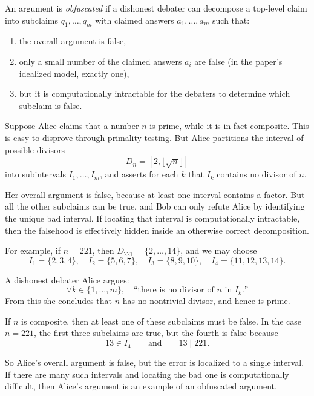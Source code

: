 \documentclass[11pt]{article}
\begin{document}
\begin{definition}
An argument is \emph{obfuscated} if a dishonest debater can decompose a top-level claim
into subclaims \(q_1,\dots,q_m\) with claimed answers \(a_1,\dots,a_m\) such that:
\begin{enumerate}
    \item the overall argument is false,
    \item only a small number of the claimed answers \(a_i\) are false (in the paper's idealized model, exactly one),
    \item but it is computationally intractable for the debaters to determine which subclaim is false.
\end{enumerate}
\end{definition}

\begin{example}
Suppose Alice claims that a number \(n\) is prime, while it is in fact composite. This is easy to disprove through primality testing. But Alice partitions the interval of possible divisors
\[
D_n = [2,\lfloor \sqrt{n}\rfloor]
\]
into subintervals \(I_1,\dots,I_m\), and asserts for each \(k\) that \(I_k\) contains no divisor of \(n\).

Her overall argument is false, because at least one interval contains a factor. But all the other subclaims can be true, and Bob can only refute Alice by identifying the unique bad interval. If locating that interval is computationally intractable, then the falsehood is effectively hidden inside an otherwise correct decomposition.

For example, if \(n=221\), then \(D_{221}=\{2,\dots,14\}\), and we may choose
\[
I_1=\{2,3,4\},\quad
I_2=\{5,6,7\},\quad
I_3=\{8,9,10\},\quad
I_4=\{11,12,13,14\}.
\]

A dishonest debater Alice argues:
\[
\forall k\in\{1,\dots,m\},\quad
\text{``there is no divisor of \(n\) in \(I_k\).''}
\]
From this she concludes that \(n\) has no nontrivial divisor, and hence is prime.

If \(n\) is composite, then at least one of these subclaims must be false. In the case \(n=221\), the first three subclaims are true, but the fourth is false because
\[
13 \in I_4
\qquad\text{and}\qquad
13 \mid 221.
\]

So Alice's overall argument is false, but the error is localized to a single interval. If there are many such intervals and locating the bad one is computationally difficult, then Alice's argument is an example of an obfuscated argument.

\end{example}
\end{document}
